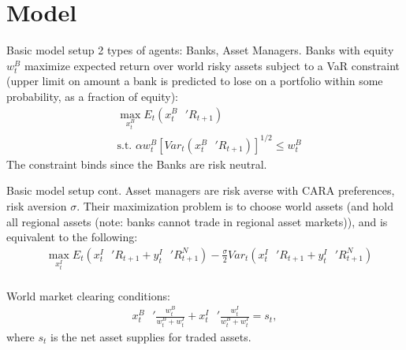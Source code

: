 \documentclass{beamer}
\begin{document}
\section{Model}
\begin{frame}{Basic model setup}
2 types of agents: Banks, Asset Managers. Banks with equity $w_t^B$ maximize expected return over world risky assets subject to a VaR constraint (upper limit on amount a bank is predicted to lose on a portfolio within some probability, as a fraction of equity):
\begin{align*}
&\max_{x_t^B} E_t(x_t^{B} \text{ }'R_{t+1})\\
&\text{s.t. } \alpha w_t^B[Var_t(x_t^B \text{ }'R_{t+1})]^{1/2}\leq w_t^B
\end{align*}
The constraint binds since the Banks are risk neutral.
\end{frame}
\begin{frame}{Basic model setup cont.}
Asset managers are risk averse with CARA preferences, risk aversion $\sigma$. Their maximization problem is to choose world assets (and hold all regional assets (note: banks cannot trade in regional asset markets)), and is equivalent to the following:
\begin{align*}
&\max_{x_t^I} E_t(x_t^{I} \text{ }'R_{t+1} + y_t^I\text{ }'R^N_{t+1}) - \frac{\sigma}{2}Var_t(x_t^{I} \text{ }'R_{t+1} + y_t^I\text{ }'R^N_{t+1})\\
\end{align*}

World market clearing conditions:
\begin{align*}
x_t^B \text{ }'\frac{w_t^B}{w_t^B + w_t^I}+x_t^I \text{ }'\frac{w_t^I}{w_t^B + w_t^I} = s_t,
\end{align*}
where $s_t$ is the net asset supplies for traded assets.
\end{frame}
\end{document}
